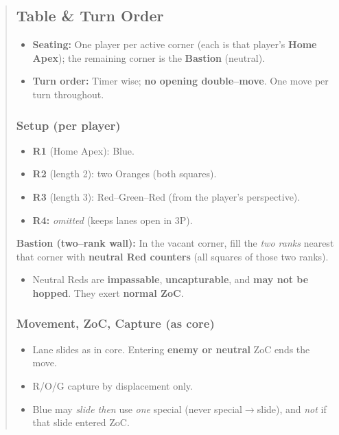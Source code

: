 \documentclass[11pt]{article}
\begin{document}
\begin{quote}
\subsection*{Table \& Turn Order}
\begin{itemize}[leftmargin=1.3em,itemsep=0.25em]
  \item \textbf{Seating:} One player per active corner (each is that player's \textbf{Home Apex}); the remaining corner is the \textbf{Bastion} (neutral).
  \item \textbf{Turn order:} Timer wise; \textbf{no opening double--move}. One move per turn throughout.
\end{itemize}

\subsubsection*{Setup (per player)}
\begin{itemize}[leftmargin=1.3em,itemsep=0.25em]
  \item \textbf{R1} (Home Apex): Blue.
  \item \textbf{R2} (length 2): two Oranges (both squares).
  \item \textbf{R3} (length 3): Red--Green--Red (from the player's perspective).
  \item \textbf{R4:} \emph{omitted} (keeps lanes open in 3P).
\end{itemize}
\noindent \textbf{Bastion (two--rank wall):} In the vacant corner, fill the \emph{two ranks} nearest that corner with \textbf{neutral Red counters} (all squares of those two ranks).
\begin{itemize}[leftmargin=1.3em,itemsep=0.25em]
  \item Neutral Reds are \textbf{impassable}, \textbf{uncapturable}, and \textbf{may not be hopped}. They exert \textbf{normal ZoC}.
\end{itemize}

\subsubsection*{Movement, ZoC, Capture (as core)}
\begin{itemize}[leftmargin=1.3em,itemsep=0.25em]
  \item Lane slides as in core. Entering \textbf{enemy or neutral} ZoC ends the move. 
  \item R/O/G capture by displacement only.
  \item Blue may \emph{slide then} use \emph{one} special (never special$\to$slide), and \emph{not} if that slide entered ZoC.
\end{itemize}


\end{quote}
\end{document}
